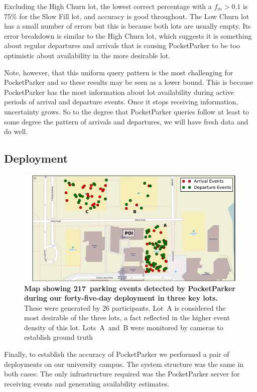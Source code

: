 Excluding the High Churn lot, the lowest correct percentage with a $f_m >
0.1$ is 75\% for the Slow Fill lot, and accuracy is good throughout. The Low
Churn lot has a small number of errors but this is because both lots are
usually empty. Its error breakdown is similar to the High Churn lot, which
suggests it is something about regular departures and arrivals that is
causing PocketParker to be too optimistic about availability in the more
desirable lot.

Note, however, that this uniform query pattern is the most challenging for
PocketParker and so these results may be seen as a lower bound. This is
because PocketParker has the most information about lot availability during
active periods of arrival and departure events. Once it stops receiving
information, uncertainty grows. So to the degree that PocketParker queries
follow at least to some degree the pattern of arrivals and departures, we
will have fresh data and do well.

\subsection{Deployment}

\begin{figure}
\centering
\includegraphics[width=\textwidth]{./figures/EventsOnThreeParkingLot.pdf}

\caption{\textbf{Map showing 217~parking events detected by PocketParker
during our forty-five-day deployment in three key lots.}  These were
generated by 26 participants.  Lot~A is considered the most desirable of the
three lots, a fact reflected in the higher event density of this lot.  
Lots~A~and~B were monitored by cameras to establish ground truth}

\label{fig-events}
\end{figure}

Finally, to establish the accuracy of PocketParker we performed a pair of
deployments on our university campus.  The system structure was the same in
both cases:  The only infrastructure required was the PocketParker server for
receiving events and generating availability estimates.

